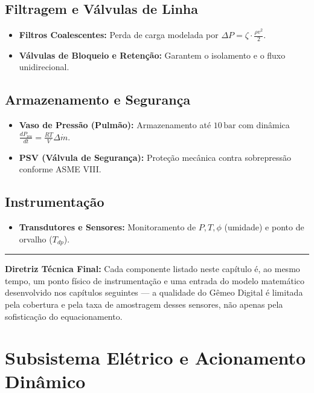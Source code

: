 \documentclass[12pt,a4paper]{article}
\numberwithin{equation}{section}
\numberwithin{table}{section}
\numberwithin{figure}{section}
\begin{document}
	\subsection{\textbf{Filtragem e Válvulas de Linha}}
	\begin{itemize}
		\item \textbf{Filtros Coalescentes:} Perda de carga modelada por $\Delta P = \zeta \cdot \frac{\rho v^2}{2}$.
		\item \textbf{Válvulas de Bloqueio e Retenção:} Garantem o isolamento e o fluxo unidirecional.
	\end{itemize}
	
	\subsection{\textbf{Armazenamento e Segurança}}
	\begin{itemize}
		\item \textbf{Vaso de Pressão (Pulmão):} Armazenamento até $10\,\text{bar}$ com dinâmica $\frac{dP_{\text{res}}}{dt} = \frac{R T}{V} \Delta \dot{m}$.
		\item \textbf{PSV (Válvula de Segurança):} Proteção mecânica contra sobrepressão conforme ASME VIII.
	\end{itemize}
	
	\subsection{\textbf{Instrumentação}}
	\begin{itemize}
		\item \textbf{Transdutores e Sensores:} Monitoramento de $P, T, \phi$ (umidade) e ponto de orvalho ($T_{dp}$).
	\end{itemize}

	\vspace{1em}
	\hrule
	\vspace{1em}

	\textbf{Diretriz Técnica Final:} Cada componente listado neste capítulo é, ao mesmo tempo, um ponto físico de instrumentação e uma entrada do modelo matemático desenvolvido nos capítulos seguintes — a qualidade do Gêmeo Digital é limitada pela cobertura e pela taxa de amostragem desses sensores, não apenas pela sofisticação do equacionamento.

	
	
	\section{\textbf{Subsistema Elétrico e Acionamento Dinâmico}}
	
\end{document}
